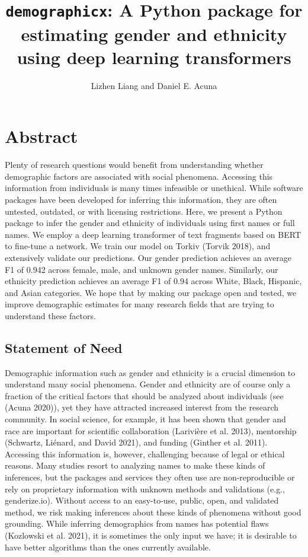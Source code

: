 \documentclass[]{article}
\title{\texttt{demographicx}: A Python package for estimating gender and
ethnicity using deep learning transformers}
\author[]{Lizhen Liang and Daniel E. Acuna}
\affil{School of Information Studies, Syracuse University, Syracuse, NY}
\date{}
\begin{document}
\maketitle

\hypertarget{abstract}{%
\section{Abstract}\label{abstract}}

Plenty of research questions would benefit from understanding whether
demographic factors are associated with social phenomena. Accessing this
information from individuals is many times infeasible or unethical.
While software packages have been developed for inferring this
information, they are often untested, outdated, or with licensing
restrictions. Here, we present a Python package to infer the gender and
ethnicity of individuals using first names or full names. We employ a
deep learning transformer of text fragments based on BERT to fine-tune a
network. We train our model on Torkiv (Torvik 2018), and extensively
validate our predictions. Our gender prediction achieves an average F1
of 0.942 across female, male, and unknown gender names. Similarly, our
ethnicity prediction achieves an average F1 of 0.94 across White, Black,
Hispanic, and Asian categories. We hope that by making our package open
and tested, we improve demographic estimates for many research fields
that are trying to understand these factors.

\hypertarget{statement-of-need}{%
\subsection{Statement of Need}\label{statement-of-need}}

Demographic information such as gender and ethnicity is a crucial
dimension to understand many social phenomena. Gender and ethnicity are
of course only a fraction of the critical factors that should be
analyzed about individuals (see (Acuna 2020)), yet they have attracted
increased interest from the research community. In social science, for
example, it has been shown that gender and race are important for
scientific collaboration (Larivière et al. 2013), mentorship (Schwartz,
Liénard, and David 2021), and funding (Ginther et al. 2011). Accessing
this information is, however, challenging because of legal or ethical
reasons. Many studies resort to analyzing names to make these kinds of
inferences, but the packages and services they often use are
non-reproducible or rely on proprietary information with unknown methods
and validations (e.g., genderize.io). Without access to an easy-to-use,
public, open, and validated method, we risk making inferences about
these kinds of phenomena without good grounding. While inferring
demographics from names has potential flaws (Kozlowski et al. 2021), it
is sometimes the only input we have; it is desirable to have better
algorithms than the ones currently available.
\end{document}
